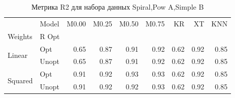 \begin{table}
\caption{Метрика R2 для набора данных Spiral,Pow A,Simple B}
\label{tab:R2_Spiral,Pow A,Simple B}
\begin{tabular}{llrrrrrrr}
\toprule
 & Model & M0.00 & M0.25 & M0.50 & M0.75 & KR & XT & KNN \\
Weights & R Opt &  &  &  &  &  &  &  \\
\midrule
\multirow[t]{2}{*}{Linear} & Opt & 0.65 & 0.87 & 0.91 & 0.92 & 0.62 & 0.92 & 0.85 \\
 & Unopt & 0.65 & 0.87 & 0.91 & 0.92 & 0.62 & 0.92 & 0.85 \\

\multirow[t]{2}{*}{Squared} & Opt & 0.91 & 0.92 & 0.93 & 0.93 & 0.62 & 0.92 & 0.85 \\
 & Unopt & 0.91 & 0.92 & 0.92 & 0.93 & 0.62 & 0.92 & 0.85 \\

\bottomrule
\end{tabular}
\end{table}
